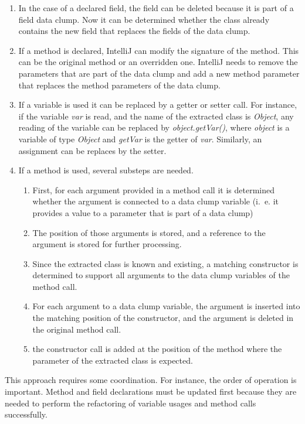 \begin{enumerate}
    \item In the case of a declared field, the field can be deleted because it is part of a field data clump. Now it can be determined whether the class already contains the new field that replaces the fields of the data clump.
    \item If a method is declared, IntelliJ can modify the signature of the method. This can be the original method or an overridden one. IntelliJ needs to remove the parameters that are part of the data clump and add a new method parameter that replaces the method parameters of the data clump. 
    \item If a variable is used it can be replaced by a getter or setter call. For instance, if the variable \textit{var} is read, and the name of the extracted class is \textit{Object}, any reading of the variable can be replaced by  \textit{object.getVar()}, where \textit{object} is a variable of type \textit{Object} and \textit{getVar} is the getter of \textit{var}. Similarly, an assignment can be replaces by the setter.
    \item If a method is used, several substeps are needed.
    \begin{enumerate}
        \item First, for each argument provided in a method call it is determined whether the argument is connected to a data clump variable (i.~e. it provides a value to a parameter that is part of a data clump) 
        \item The position of those arguments is stored, and a reference to the argument is stored for further processing.
        \item Since the extracted class is known and existing, a matching constructor is determined to support all arguments to the data clump variables of the method call. 
        \item For each argument to a data clump variable, the argument is inserted into the matching position of the constructor, and the argument is deleted in the original method call. 
        \item the constructor call is added at the position of the method  where the parameter of the extracted class is expected. 
        
    \end{enumerate}
    
\end{enumerate}

This approach requires some coordination. For instance, the order of operation is important. Method and field declarations must be updated first because they are needed to perform the refactoring of variable usages and method calls successfully. 

